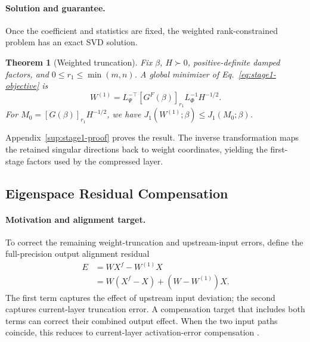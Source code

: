 \documentclass[11pt]{article}
\newtheorem{theorem}{Theorem}
\begin{document}
\paragraph{Solution and guarantee.}
Once the coefficient and statistics are fixed, the weighted rank-constrained problem has an exact SVD solution.
\begin{theorem}[Weighted truncation]\label{thm:fisher}
Fix $\beta$, $H\succ0$, positive-definite damped factors, and $0\le r_1\le\min(m,n)$. A global minimizer of Eq.~\eqref{eq:stage1-objective} is
\begin{equation}
W^{(1)}=L_\Psi^{-\top}[G^F(\beta)]_{r_1}
L_\Phi^{-1}H^{-1/2}.
\label{eq:stage1-output}
\end{equation}
For $M_0=[G(\beta)]_{r_1}H^{-1/2}$, we have $J_1(W^{(1)};\beta)\le J_1(M_0;\beta)$.
\end{theorem}
Appendix~\ref{sup:stage1-proof} proves the result. The inverse transformation maps the retained singular directions back to weight coordinates, yielding the first-stage factors used by the compressed layer.

\subsection{Eigenspace Residual Compensation}\label{sec:eigenspace-comp}

\paragraph{Motivation and alignment target.}
To correct the remaining weight-truncation and upstream-input errors, define the full-precision output alignment residual
\begin{equation}
\begin{aligned}
E&=WX^f-W^{(1)}X\\
 &=W(X^f-X)+(W-W^{(1)})X.
\end{aligned}
\label{eq:global-alignment-error}
\end{equation}
The first term captures the effect of upstream input deviation; the second captures current-layer truncation error. A compensation target that includes both terms can correct their combined output effect. When the two input paths coincide, this reduces to current-layer activation-error compensation \citep{liu2025eora}.
\end{document}

